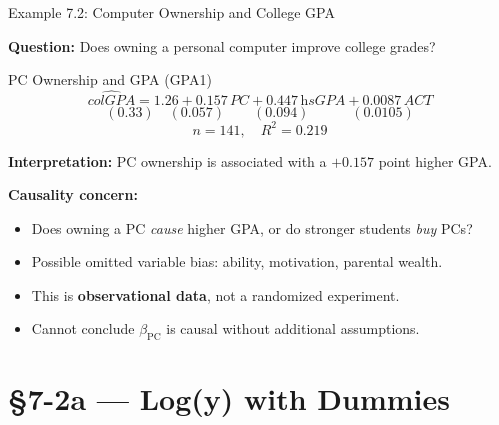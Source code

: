 \documentclass[aspectratio=169, 12pt]{beamer}
\begin{document}
\begin{frame}[shrink=25]{Example 7.2: Computer Ownership and College GPA}

  \textbf{Question:} Does owning a personal computer improve college grades?

  \medskip

  \begin{examplebox}{PC Ownership and GPA (GPA1)}
    \[
      \widehat{\textit{colGPA}} = 1.26 + 0.157 \, \textit{PC} + 0.447 \, \textit{hsGPA} + 0.0087 \, \textit{ACT}
    \]
    \[
      (0.33) \quad (0.057) \quad\quad (0.094) \quad\quad\quad (0.0105)
    \]
    \[
      n = 141, \quad R^2 = 0.219
    \]
  \end{examplebox}

  \medskip

  \textbf{Interpretation:} PC ownership is associated with a $+0.157$ point higher GPA.

  \medskip

  \begin{keybox}
    \textbf{Causality concern:}
    \begin{itemize}
      \item Does owning a PC \textit{cause} higher GPA, or do stronger students \textit{buy} PCs?
      \item Possible omitted variable bias: ability, motivation, parental wealth.
      \item This is \textbf{observational data}, not a randomized experiment.
      \item Cannot conclude $\beta_{\text{PC}}$ is causal without additional assumptions.
    \end{itemize}
  \end{keybox}

\end{frame}

\section{\texorpdfstring{\S7-2a}{S7-2a} — Log(y) with Dummies}
\end{document}
